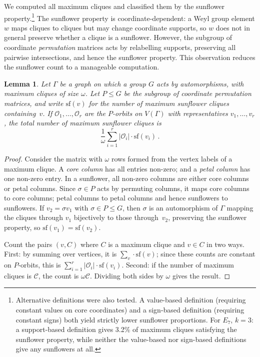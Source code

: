 \documentclass[11pt]{article}
\newtheorem{lemma}[theorem]{Lemma}
\begin{document}
We computed all maximum cliques and classified them by the sunflower property.\footnote{Alternative definitions were also tested. A value-based definition (requiring constant values on core coordinates) and a sign-based definition (requiring constant signs) both yield strictly lower sunflower proportions. For $E_7$, $k=3$: a support-based definition gives 3.2\% of maximum cliques satisfying the sunflower property, while neither the value-based nor sign-based definitions give any sunflowers at all.} The sunflower property is coordinate-dependent: a Weyl group element $w$ maps cliques to cliques but may change coordinate supports, so $w$ does not in general preserve whether a clique is a sunflower. However, the subgroup of coordinate \emph{permutation} matrices acts by relabelling supports, preserving all pairwise intersections, and hence the sunflower property. This observation reduces the sunflower count to a manageable computation.

\begin{lemma}\label{lem:sf-perm}
Let $\Gamma$ be a graph on which a group $G$ acts by automorphisms, with maximum cliques of size $\omega$. Let $P \leq G$ be the subgroup of coordinate permutation matrices, and write $\mathrm{sf}(v)$ for the number of maximum sunflower cliques containing~$v$. If $\mathcal{O}_1, \ldots, \mathcal{O}_r$ are the $P$-orbits on $V(\Gamma)$ with representatives $v_1, \ldots, v_r$, the total number of maximum sunflower cliques is
\[
\frac{1}{\omega} \sum_{i=1}^{r} |\mathcal{O}_i| \cdot \mathrm{sf}(v_i)\,.
\]
\end{lemma}

\begin{proof}
Consider the matrix with $\omega$ rows formed from the vertex labels of a maximum clique. A \textit{core column} has all entries non-zero; and a \textit{petal column} has one non-zero entry. In a sunflower, all non-zero columns are either core columns or petal columns. Since $\sigma \in P$ acts by permuting columns, it maps core columns to core columns; petal columns to petal columns and hence sunflowers to sunflowers. If $v_2 = \sigma v_1$ with $\sigma \in P \leq G$, then $\sigma$ is an automorphism of $\Gamma$ mapping the cliques through $v_1$ bijectively to those through~$v_2$, preserving the sunflower property, so $\mathrm{sf}(v_1) = \mathrm{sf}(v_2)$.

Count the pairs $(v, C)$ where $C$ is a maximum clique and $v \in C$ in two ways. First: by summing over vertices, it is $\sum_{v} \cdot \mathrm{sf}(v)$; since these counts are constant on $P$-orbits, this is $\sum_{i=1}^{r} |\mathcal{O}_i| \cdot \mathrm{sf}(v_i)$. Second: if the number of maximum cliques is $\mathcal{C}$, the count is $\omega \mathcal{C}$. Dividing both sides by $\omega$ gives the result. 
\end{proof}
\end{document}

